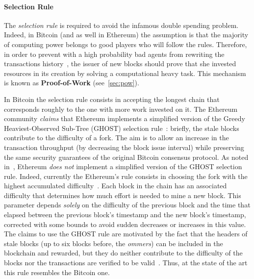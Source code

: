\paragraph{Selection Rule}
The \emph{selection rule} is required to avoid the infamous double spending
problem. Indeed, in Bitcoin (and as well in Ethereum) the assumption is that the
majority of computing power belongs to good players who will follow the rules.
Therefore, in order to prevent with a high probability bad agents from rewriting
the transactions history~\cite{bib:bitcoin}, the issuer of new blocks should
prove that she invested resources in its creation by solving a computational
heavy task. This mechanism is known as \textbf{Proof-of-Work}
(see~\autoref{sec:pow}).



In Bitcoin the selection rule consists in accepting the longest chain that
corresponds roughly to the one with more work invested on it. The Ethereum
community \emph{claims} that Ethereum implements a simplified version of the
Greedy Heaviest-Observed Sub-Tree (GHOST) selection
rule~\cite{wood2018ethereum}: briefly, the stale blocks contribute to the
difficulty of a fork. The aim is to allow an increase in the transaction
throughput (by decreasing the block issue interval) while preserving the same
security guarantees of the original Bitcoin consensus protocol. As noted
in~\cite{bib:securityAndScalabilityPoW}, Ethereum \emph{does not} implement a
simplified version of the GHOST selection rule. Indeed, currently the Ethereum's
rule consists in choosing the fork with the highest accumulated
difficulty~\cite{wood2018ethereum}. Each block in the chain has an associated
difficulty that determines how much effort is needed to mine a new block. This
parameter depends \emph{solely} on the difficulty of the previous block and the
time that elapsed between the previous block's timestamp and the new block's
timestamp, corrected with some bounds to avoid sudden decreases or increases in
this value. The claims to use the GHOST rule are motivated by the fact that the
headers of stale blocks (up to six blocks before, the \emph{ommers}) can be
included in the blockchain and rewarded, but they do neither contribute to the
difficulty of the blocks nor the transactions are verified to be
valid~\cite{bib:securityAndScalabilityPoW}. Thus, at the state of the art this
rule resembles the Bitcoin one.





